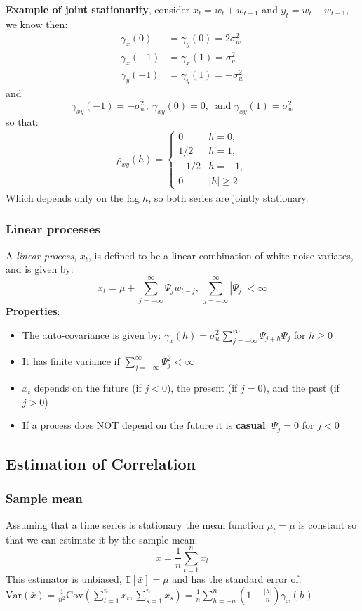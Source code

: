 \documentclass[11pt]{article}
\newcommand{\noi}{\noindent}
\begin{document}
\noindent \textbf{Example of joint stationarity}, consider $x_t = w_t + w_{t-1}$ and $y_t = w_t - w_{t-1}$, we know then:
\begin{align*}
    \gamma_x(0) &= \gamma_y(0) = 2\sigma_w^2 \\
    \gamma_x(-1) &= \gamma_x(1) = \sigma_w^2 \\
    \gamma_y(-1) &= \gamma_y(1) = -\sigma_w^2
\end{align*} \phantom{i}
\noindent and
$$\gamma_{xy}(-1) = -\sigma_w^2, \: \gamma_{xy}(0) = 0, \: \text{ and } \gamma_{xy}(1) = \sigma_w^2$$
\noindent so that:
\begin{align*}
    \rho_{xy}(h) = \begin{cases}
        0 & h=0, \\
        1/2 & h=1, \\
        -1/2 & h=-1, \\
        0 & |h| \geq 2
    \end{cases}
\end{align*} \phantom{i}
Which depends only on the lag $h$, so both series are jointly stationary.

\subsubsection{Linear processes}
\noi A \textit{linear process}, $x_t$, is defined to be a linear combination of white noise variates, and is given by:
$$x_t = \mu + \sum_{j=-\infty}^{\infty}{\Psi_j w_{t-j}}, \: \sum_{j=-\infty}^{\infty}|\Psi_j| < \infty$$
\noi \textbf{Properties}:
\begin{itemize}
    \item The auto-covariance is given by: $\gamma_x(h) = \sigma_w^2\sum_{j=-\infty}^{\infty}{\Psi_{j+h}\Psi_j}$ for $h \geq 0$
    \item It has finite variance if $\sum_{j=-\infty}^{\infty}{\Psi_j^2} < \infty$
    \item $x_t$ depends on the future (if $j<0$), the present (if $j=0$), and the past (if $j > 0$)
    \item If a process does NOT depend on the future it is \textbf{casual}: $\Psi_j = 0$ for $j < 0$
\end{itemize}

\subsection{Estimation of Correlation}
\subsubsection{Sample mean}
\noi Assuming that a time series is stationary the mean function $\mu_t = \mu$ is constant so that we can estimate it by the sample mean:
$$\bar{x} = \frac{1}{n}\sum_{t=1}^n{x_t}$$
\noi This estimator is unbiased, $\mathbb{E}[\bar x] = \mu$ and has the standard error of: $\text{Var}(\bar x) = \frac{1}{n^2}\text{Cov}(\sum_{t=1}^n{x_t}, \sum_{s=1}^n{x_s}) = \frac{1}{n}\sum_{h=-n}^n{(1-\frac{|h|}{n})}\gamma_x(h)$
\end{document}
